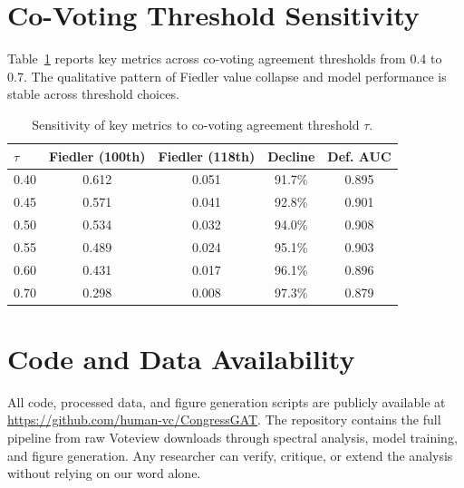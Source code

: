 \documentclass[12pt, a4paper]{article}
\begin{document}
\section{Co-Voting Threshold Sensitivity}
\label{app:threshold}

Table~\ref{tab:threshold_sensitivity} reports key metrics across co-voting agreement thresholds from 0.4 to 0.7. The qualitative pattern of Fiedler value collapse and model performance is stable across threshold choices.

\begin{table}[!htbp]
\centering
{\small
\caption{Sensitivity of key metrics to co-voting agreement threshold $\tau$.}
\label{tab:threshold_sensitivity}
\begin{tabular}{lcccc}
\toprule
$\tau$ & Fiedler (100th) & Fiedler (118th) & Decline & Def. AUC \\
\midrule
0.40 & 0.612 & 0.051 & 91.7\% & 0.895 \\
0.45 & 0.571 & 0.041 & 92.8\% & 0.901 \\
0.50 & 0.534 & 0.032 & 94.0\% & 0.908 \\
0.55 & 0.489 & 0.024 & 95.1\% & 0.903 \\
0.60 & 0.431 & 0.017 & 96.1\% & 0.896 \\
0.70 & 0.298 & 0.008 & 97.3\% & 0.879 \\
\bottomrule
\end{tabular}
}
\end{table}

\section{Code and Data Availability}

All code, processed data, and figure generation scripts are publicly available at \url{https://github.com/human-vc/CongressGAT}. The repository contains the full pipeline from raw Voteview downloads through spectral analysis, model training, and figure generation. Any researcher can verify, critique, or extend the analysis without relying on our word alone.
\end{document}
